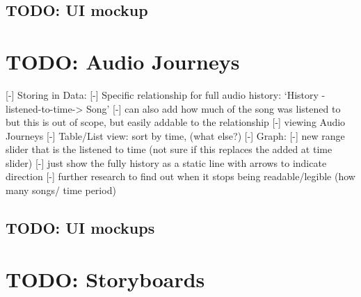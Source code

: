 \subsection{TODO: UI mockup}

\section{TODO: Audio Journeys}
[-] Storing in Data:
    [-] Specific relationship for full audio history: `History -listened-to-time-> Song'
    [-] can also add how much of the song was listened to but this is out of scope, but easily addable to the relationship
[-] viewing Audio Journeys
    [-] Table/List view: sort by time, (what else?)
    [-] Graph:
        [-] new range slider that is the listened to time (not sure if this replaces the added at time slider)
        [-] just show the fully history as a static line with arrows to indicate direction
        [-] further research to find out when it stops being readable/legible (how many songs/ time period)
\subsection{TODO: UI mockups}

\section{TODO: Storyboards}%